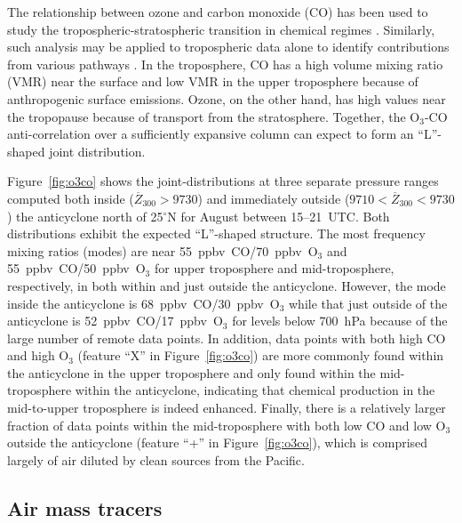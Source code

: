 The relationship between ozone and carbon monoxide ({CO}) has been
used to study the tropospheric-stratospheric transition in chemical regimes
\citep[e.g.][and references therein]{Pan:2007sw,Hegglin:2009fk}. Similarly,
such analysis may be applied to tropospheric data alone to identify contributions
from various pathways \citep[e.g.][]{Zhang:2006zr,Voulgarakis:2011fk,Cristofanelli:2013uq}.
In the troposphere, CO has a high volume mixing ratio (VMR) near the surface and low VMR in the upper
troposphere because of anthropogenic surface emissions. Ozone, on the other hand,
has high values near the tropopause because of transport from the stratosphere.
Together, the {O$_3$-CO} anti-correlation over a sufficiently expansive column
can expect to form an ``L''-shaped joint distribution.

Figure~\ref{fig:o3co} shows the joint-distributions at three separate pressure ranges
computed both inside ($\overline Z_{300}>9730$) and immediately
outside ($9710<\overline Z_{300}<9730$) the anticyclone north of 25$^\circ$N for
August between 15--21~UTC. Both distributions exhibit the expected ``L''-shaped
structure. The most frequency mixing ratios (modes) are near 55~ppbv~CO/70~ppbv~O$_3$ and 55~ppbv~CO/50~ppbv~O$_3$ for
upper troposphere and mid-troposphere, respectively, in both within and just outside the anticyclone.
However, the mode inside the anticyclone is 68~ppbv~CO/30~ppbv~O$_3$ while that
just outside of the anticyclone is 52~ppbv~CO/17~ppbv~O$_3$ for levels below 700~hPa
because of the large number of remote data points.
In addition, data points with both high CO and high O$_3$ (feature ``X'' in Figure~\ref{fig:o3co})
are more commonly found within the anticyclone in the upper troposphere and only
found within the mid-troposphere within the anticyclone, indicating that chemical
production in the mid-to-upper troposphere is indeed enhanced. Finally, there is
a relatively larger fraction of data points within the mid-troposphere with both low CO
and low O$_3$ outside the anticyclone (feature ``+'' in Figure~\ref{fig:o3co}), which
is comprised largely of air diluted by clean sources from the Pacific.

\subsection{Air mass tracers}\label{sect:diag/passive}

